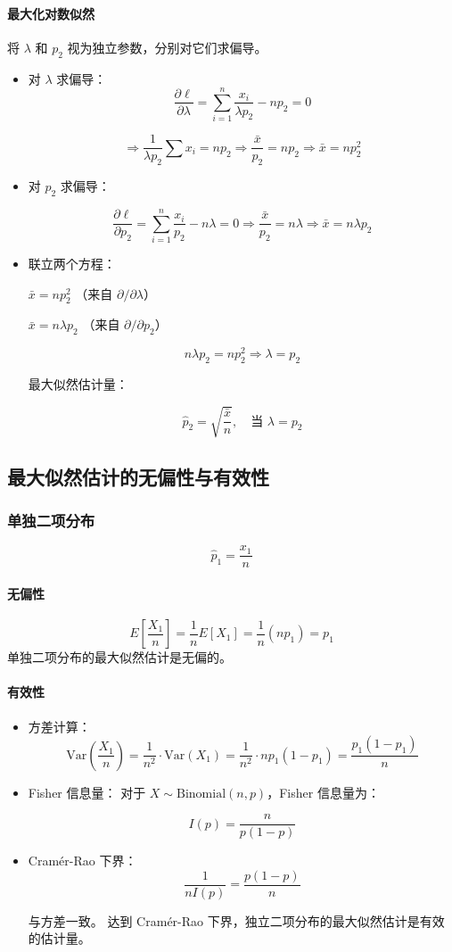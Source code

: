 \documentclass{article}
\begin{document}
\paragraph{最大化对数似然}
将 $ \lambda $ 和 $ p_2 $ 视为独立参数，分别对它们求偏导。
\begin{itemize}
    \item 对 $ \lambda $ 求偏导：    
$$
\frac{\partial \ell}{\partial \lambda} = \sum_{i=1}^n \frac{x_i}{\lambda p_2} - n p_2 = 0
$$

$$
\Rightarrow \frac{1}{\lambda p_2} \sum x_i = n p_2 \Rightarrow \frac{\bar{x}}{p_2} = n p_2 \Rightarrow \bar{x} = n p_2^2
$$
\item 对 $ p_2 $ 求偏导：

$$
\frac{\partial \ell}{\partial p_2} = \sum_{i=1}^n \frac{x_i}{p_2} - n \lambda = 0
\Rightarrow \frac{\bar{x}}{p_2} = n \lambda
\Rightarrow \bar{x} = n \lambda p_2
$$

\item 联立两个方程：

$ \bar{x} = n p_2^2 $ （来自 $ \partial/\partial \lambda $） 

$ \bar{x} = n \lambda p_2 $ （来自 $ \partial/\partial p_2 $）

$$
n \lambda p_2 = n p_2^2 \Rightarrow \lambda = p_2
$$

最大似然估计量：

$$
\hat{p}_2 = \sqrt{\frac{\bar{x}}{n}}, \quad \text{当 } \lambda = p_2
$$

\end{itemize}

\subsection{最大似然估计的无偏性与有效性}
\subsubsection{单独二项分布} 
$$
\hat{p}_1 = \frac{x_1}{n}
$$
\paragraph{无偏性}
$$
E\left[ \frac{X_1}{n} \right] = \frac{1}{n} E[X_1] = \frac{1}{n} (np_1) = p_1
$$
单独二项分布的最大似然估计是无偏的。
\paragraph{有效性}
\begin{itemize}
    \item 方差计算：
    $$
\text{Var}\left( \frac{X_1}{n} \right) = \frac{1}{n^2} \cdot \text{Var}(X_1) = \frac{1}{n^2} \cdot np_1(1 - p_1) = \frac{p_1(1 - p_1)}{n}
$$
    \item Fisher 信息量：
    对于 $ X \sim \text{Binomial}(n, p) $，Fisher 信息量为：

$$
I(p) = \frac{n}{p(1 - p)}
$$
    \item Cramér-Rao 下界： 
    $$
\frac{1}{n I(p)} = \frac{p(1 - p)}{n}
$$

与方差一致。
达到 Cramér-Rao 下界，独立二项分布的最大似然估计是有效的估计量。

\end{itemize}
\end{document}

